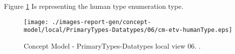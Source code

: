 Figure \ref{fig:lu.uni.lassy.excalibur.group09.spec-CM-view-local-PrimaryTypes-Datatypes-06} Is representing the human type enumeration type.



\begin{figure}[htbp] 
\label{fig:lu.uni.lassy.excalibur.group09.spec-CM}
\begin{center}
\texttt{[image: ./images-report-gen/concept-model/local/PrimaryTypes-Datatypes/06/cm-etv-humanType.eps]}
\end{center}
\caption[Concept Model - PrimaryTypes-Datatypes local view 06 - ]{Concept Model - PrimaryTypes-Datatypes local view 06. .}
\label{fig:lu.uni.lassy.excalibur.group09.spec-CM-view-local-PrimaryTypes-Datatypes-06}
\end{figure}
\vspace{0.5cm} 
